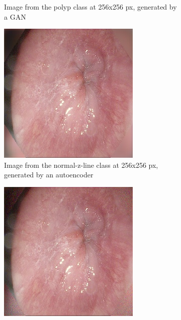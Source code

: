 \begin{figure}[h]
\begin{subfigure}[t]{0.4\textwidth}
            \caption{Image from the polyp class at 256x256 px, generated by a GAN}    
            \label{fig:polyp_GAN_CORNER1}
        \end{subfigure}
        \qquad\vfill%
        \begin{subfigure}[t]{0.4\textwidth}   
            \centering 
            \includegraphics[width=\textwidth]{experiments/figures/blackcorner/zAE.jpg}
            \caption{Image from the normal-z-line class at 256x256 px, generated by an autoencoder }   
            \label{fig:z_AE_CORNER1}
        \end{subfigure}
        \qquad%
        \begin{subfigure}[t]{0.4\textwidth}   
            \centering 
            \includegraphics[width=\textwidth]{experiments/figures/blackcorner/zGAN.jpg}

\end{subfigure}
\end{figure}
